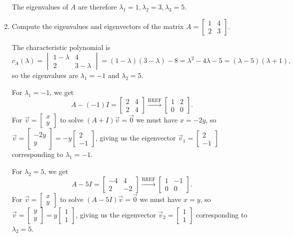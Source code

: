 \documentclass[12pt]{article}
\newcommand{\bbm}{\begin{bmatrix}}
\newcommand{\ebm}{\end{bmatrix}}
\newcommand{\bvm}{\begin{vmatrix}}
\newcommand{\evm}{\end{vmatrix}}
\begin{document}
\begin{enumerate}
The eigenvalues of $A$ are therefore $\lambda_1=1, \lambda_2=3, \lambda_3=5$.
\item Compute the eigenvalues and eigenvectors of the matrix $A = \bbm 1&4\\2&3\ebm$.

\bigskip

The characteristic polynomial is
\[
c_A(\lambda) = \bvm 1-\lambda&4\\2&3-\lambda\evm = (1-\lambda)(3-\lambda)-8=\lambda^2-4\lambda-5=(\lambda-5)(\lambda+1),
\]
so the eigenvalues are $\lambda_1=-1$ and $\lambda_2=5$.

For $\lambda_1=-1$, we get
\[
A-(-1)I = \bbm 2&4\\2&4\ebm \xrightarrow{\text{RREF}} \bbm 1&2\\0&0\ebm.
\]
For $\vec{v}=\bbm x\\y\ebm$ to solve $(A+I)\vec{v}=\vec{0}$ we must have $x=-2y$, so $\vec{v} = \bbm -2y\\y\ebm = -y\bbm 2\\-1\ebm$, giving us the eigenvector $\vec{v}_1=\bbm 2\\-1\ebm$ corresponding to $\lambda_1=-1$.

For $\lambda_2=5$, we get
\[
A-5I = \bbm -4&4\\2&-2\ebm \xrightarrow{\text{RREF}} \bbm 1&-1\\0&0\ebm.
\]
For $\vec{v} = \bbm x\\y\ebm$ to solve $(A-5I)\vec{v}=\vec{0}$ we must have $x=y$, so $\vec{v}=\bbm y\\y\ebm = y\bbm 1\\1\ebm$, giving us the eigenvector $\vec{v}_2=\bbm 1\\1\ebm$ corresponding to $\lambda_2=5$.


 \end{enumerate}
\end{document}
